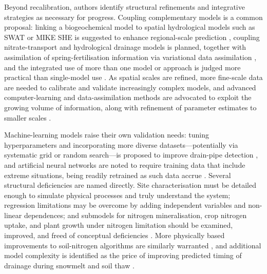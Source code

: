 Beyond recalibration, authors identify structural refinements and integrative strategies as necessary for progress. Coupling complementary models is a common proposal: linking a biogeochemical model to spatial hydrological models such as SWAT or MIKE SHE is suggested to enhance regional-scale prediction \parencite{Li2006}, coupling nitrate-transport and hydrological drainage models is planned, together with assimilation of spring-fertilisation information via variational data assimilation \parencite{Chelil2022}, and the integrated use of more than one model or approach is judged more practical than single-model use \parencite{Singh2019b}. As spatial scales are refined, more fine-scale data are needed to calibrate and validate increasingly complex models, and advanced computer-learning and data-assimilation methods are advocated to exploit the growing volume of information, along with refinement of parameter estimates to smaller scales \parencite{Apostel2021}.

Machine-learning models raise their own validation needs: tuning hyperparameters and incorporating more diverse datasets---potentially via systematic grid or random search---is proposed to improve drain-pipe detection \parencite{Song2021}, and artificial neural networks are noted to require training data that include extreme situations, being readily retrained as such data accrue \parencite{Yang2000}. Several structural deficiencies are named directly. Site characterisation must be detailed enough to simulate physical processes and truly understand the system; regression limitations may be overcome by adding independent variables and non-linear dependences; and submodels for nitrogen mineralisation, crop nitrogen uptake, and plant growth under nitrogen limitation should be examined, improved, and freed of conceptual deficiencies \parencite{Ahuja2007}. More physically based improvements to soil-nitrogen algorithms are similarly warranted \parencite{Ikenberry2017}, and additional model complexity is identified as the price of improving predicted timing of drainage during snowmelt and soil thaw \parencite{Feyereisen2007}.

